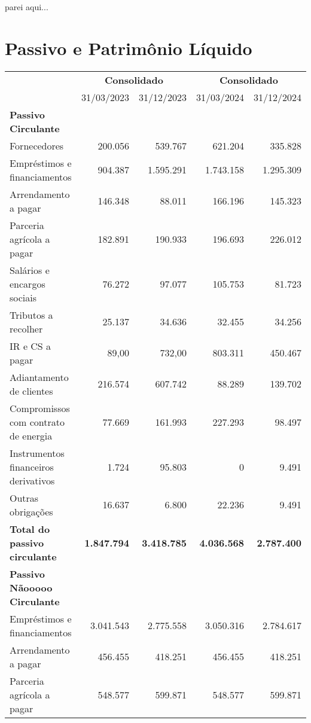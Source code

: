 \documentclass[1pt,a4paper]{article}
\begin{document}
		
		\newpage
		parei aqui...
		\centering\section*{Passivo e Patrimônio Líquido}
		\begin{longtable}{p{6cm} r r r r}
			\toprule
			& \multicolumn{2}{c}{\textbf{Consolidado}} & \multicolumn{2}{c}{\textbf{Consolidado}} \\
			\cmidrule(lr){2-3} \cmidrule(lr){4-5}
			& 31/03/2023 & 31/12/2023 & 31/03/2024 & 31/12/2024 \\
			\midrule
			\endhead
			\textbf{Passivo Circulante} & & & & \\
			Fornecedores & 200.056 & 539.767 & 621.204 & 335.828 \\
			Empréstimos e financiamentos & 904.387 & 1.595.291 & 1.743.158 & 1.295.309 \\
			Arrendamento a pagar & 146.348 & 88.011 & 166.196 & 145.323 \\
			Parceria agrícola a pagar & 182.891 & 190.933 & 196.693 & 226.012 \\
			Salários e encargos sociais & 76.272 & 97.077 & 105.753 & 81.723 \\
			Tributos a recolher & 25.137 & 34.636 & 32.455 & 34.256 \\
			IR e CS a pagar & 89,00 & 732,00 & 803.311 & 450.467 \\
			Adiantamento de clientes & 216.574 & 607.742 & 88.289 & 139.702 \\
			Compromissos com contrato de energia & 77.669 & 161.993 & 227.293 & 98.497 \\
			Instrumentos financeiros derivativos & 1.724 & 95.803 & 0 & 9.491 \\
			Outras obrigações & 16.637 & 6.800 & 22.236 & 9.491 \\
			\rowcolor{darkgray}\textbf{Total do passivo circulante} & \textbf{1.847.794} & \textbf{3.418.785} & \textbf{4.036.568} & \textbf{2.787.400} \\
			\midrule
			\textbf{Passivo Nãooooo Circulante} & & & & \\
			Empréstimos e financiamentos & 3.041.543 & 2.775.558 & 3.050.316 & 2.784.617 \\
			Arrendamento a pagar & 456.455 & 418.251 & 456.455 & 418.251 \\
			Parceria agrícola a pagar & 548.577 & 599.871 & 548.577 & 599.871 \\

\end{longtable}
\end{document}
